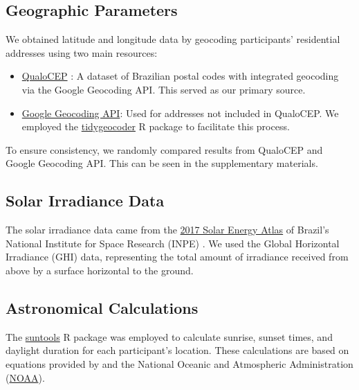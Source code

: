 \documentclass[
12pt,
openright,
oneside,
a4paper,
chapter=TITLE,
section=TITLE,
french,
spanish,
brazil,
english
]{abntex2}
\providecommand{\tightlist}{
\setlength{\itemsep}{0ex}\setlength{\parskip}{0\baselineskip}}
\begin{document}
\subsection{Geographic Parameters}\label{geographic-parameters}

We obtained latitude and longitude data by geocoding participants'
residential addresses using two main resources:

\begin{itemize}
\tightlist
\item
  \href{https://www.qualocep.com/}{QualoCEP} \autocite{qualocep2024}: A
  dataset of Brazilian postal codes with integrated geocoding via the
  Google Geocoding API. This served as our primary source.
\item
  \href{https://developers.google.com/maps/documentation/geocoding/overview}{Google
  Geocoding API}: Used for addresses not included in QualoCEP. We
  employed the
  \href{https://jessecambon.github.io/tidygeocoder/}{tidygeocoder} R
  package \autocite{cambon2021} to facilitate this process.
\end{itemize}

To ensure consistency, we randomly compared results from QualoCEP and
Google Geocoding API. This can be seen in the supplementary materials.

\subsection{Solar Irradiance Data}\label{solar-irradiance-data}

The solar irradiance data came from the
\href{https://labren.ccst.inpe.br/atlas_2017.html}{2017 Solar Energy
Atlas} of Brazil's National Institute for Space Research (INPE)
\autocite{pereira2017}. We used the Global Horizontal Irradiance (GHI)
data, representing the total amount of irradiance received from above by
a surface horizontal to the ground.

\subsection{Astronomical Calculations}\label{astronomical-calculations}

The \href{https://doi.org/10.32614/CRAN.package.suntools}{suntools} R
package \autocite{bivand} was employed to calculate sunrise, sunset
times, and daylight duration for each participant's location. These
calculations are based on equations provided by \textcite{meeus1991} and
the National Oceanic and Atmospheric Administration
(\href{https://gml.noaa.gov/grad/solcalc/calcdetails.html}{NOAA}).
\end{document}
